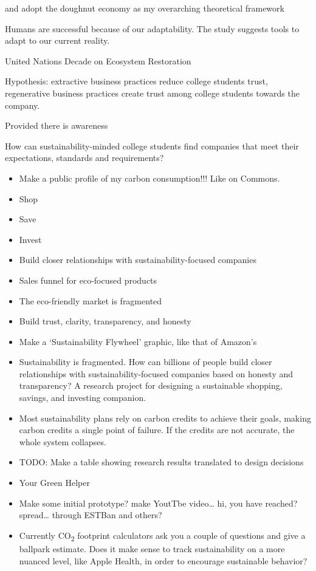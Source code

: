 \documentclass[
  letterpaper,
  DIV=11,
  numbers=noendperiod]{scrartcl}
\begin{document}
and adopt the doughnut economy as my overarching theoretical framework

Humans are successful because of our adaptability. The study suggests
tools to adapt to our current reality.

United Nations Decade on Ecosystem Restoration

Hypothesis: extractive business practices reduce college students trust,
regenerative business practices create trust among college students
towards the company.

Provided there is awareness

How can sustainability-minded college students find companies that meet
their expectations, standards and requirements?

\begin{itemize}
\item
  Make a public profile of my carbon consumption!!! Like on Commons.
\item
  Shop
\item
  Save
\item
  Invest
\item
  Build closer relationships with sustainability-focused companies
\item
  Sales funnel for eco-focused products
\item
  The eco-friendly market is fragmented
\item
  Build trust, clarity, transparency, and honesty
\item
  Make a `Sustainability Flywheel' graphic, like that of Amazon's
\item
  Sustainability is fragmented. How can billions of people build closer
  relationships with sustainability-focused companies based on honesty
  and transparency? A research project for designing a sustainable
  shopping, savings, and investing companion.
\item
  Most sustainability plans rely on carbon credits to achieve their
  goals, making carbon credits a single point of failure. If the credits
  are not accurate, the whole system collapses.
\item
  TODO: Make a table showing research results translated to design
  decisions
\item
  Your Green Helper
\item
  Make some initial prototype? make YoutTbe video\ldots{} hi, you have
  reached? spread\ldots{} through ESTBan and others?
\item
  Currently CO\textsubscript{2} footprint calculators ask you a couple
  of questions and give a ballpark estimate. Does it make sense to track
  sustainability on a more nuanced level, like Apple Health, in order to
  encourage sustainable behavior?
\end{itemize}
\end{document}
